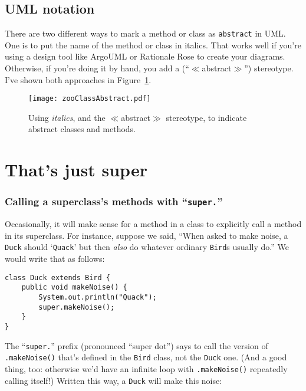\subsection{UML notation}

There are two different ways to mark a method or class as \texttt{abstract} in
UML. One is to put the name of the method or class in italics. That works well
if you're using a design tool like ArgoUML or Rationale Rose to create your
diagrams. Otherwise, if you're doing it by hand, you add a
(``$\ll$abstract$\gg$'') stereotype. I've shown both approaches in
Figure~\ref{fig:zooClassAbstract}.

\begin{figure}
\centering
\texttt{[image: zooClassAbstract.pdf]}
\caption{Using \textit{italics}, and the $\ll$abstract$\gg$ stereotype, to
indicate abstract classes and methods.}
\label{fig:zooClassAbstract}
\end{figure}

\section{That's just super}

\subsubsection{Calling a superclass's methods with ``\texttt{super.}''}

Occasionally, it will make sense for a method in a class to explicitly call a
method in its superclass. For instance, suppose we said, ``When asked to make
noise, a \texttt{Duck} should `\texttt{Quack}' but then \textit{also} do
whatever ordinary \texttt{Bird}s usually do.'' We would write that as follows:

\begin{Verbatim}[fontsize=\footnotesize,samepage=true,frame=single]
class Duck extends Bird {
    public void makeNoise() {
        System.out.println("Quack");
        super.makeNoise();
    }
}
\end{Verbatim}

The ``\texttt{super.}'' prefix (pronounced ``super dot'') says to call the
version of \texttt{.makeNoise()} that's defined in the \texttt{Bird}
class, not the \texttt{Duck} one. (And a good thing, too: otherwise we'd have
an infinite loop with \texttt{.makeNoise()} repeatedly calling itself!)
Written this way, a \texttt{Duck} will make this noise:

